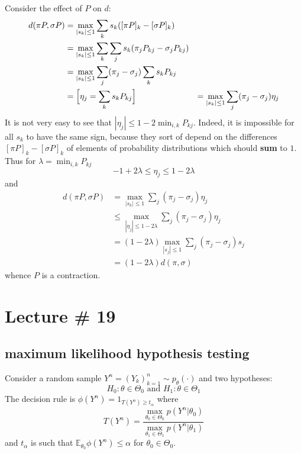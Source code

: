 \documentclass[a4paper]{article}
\newcommand{\ex}{\mathbb{E}}
\begin{document}
Consider the effect of $P$ on $d$:
\begin{align*}
	d( \pi P,\sigma P)
	&= \max_{|s_k| \leq 1} \sum_k s_k ([\pi P]_k-[\sigma P]_k)\\
	&= \max_{|s_k| \leq 1} \sum_k \sum_j s_k (\pi_j P_{kj} - \sigma_j P_{kj})\\
	&= \max_{|s_k| \leq 1} \sum_j (\pi_j - \sigma_j ) \sum_k s_k P_{kj}\\
	&= \Bigl[\eta_j = \sum_k s_k P_{kj} \Bigr]
	&= \max_{|s_k| \leq 1} \sum_j (\pi_j - \sigma_j ) \eta_j
\end{align*}
It is not very easy to see that $|\eta_j| \leq 1 - 2\min_{i,k} P_{kj}$. Indeed,
it is impossible for all $s_k$ to have the same sign, because they sort of depend
on the differences $[\pi P]_k-[\sigma P]_k$ of elements of probability distributions
which should \textbf{sum} to $1$. Thus for $\lambda = \min_{i,k} P_{kj}$
\[-1+2\lambda \leq \eta_j \leq 1-2\lambda\]
and
\begin{align*}
	d( \pi P,\sigma P)
	&= \max_{|s_k| \leq 1} \sum_j (\pi_j - \sigma_j ) \eta_j\\
	&\leq \max_{|\eta_j| \leq 1-2\lambda} \sum_j (\pi_j - \sigma_j ) \eta_j\\
	&= (1-2\lambda) \max_{|s_j| \leq 1 } \sum_j (\pi_j - \sigma_j ) s_j\\
	&= (1-2\lambda) d(\pi,\sigma)
\end{align*}
whence $P$ is a contraction.



\section{Lecture \# 19} %
\label{sec:lecture_19}

\subsection{maximum likelihood hypothesis testing} %
\label{sub:maximum_likelihood_hypothesis_testing}

Consider a random sample $Y^n = (Y_k)_{k=1}^n\sim p_\theta(\cdot)$ and two hypotheses:
\[H_0: \theta\in \Theta_0\text{ and }H_1: \theta\in \Theta_1\]
The decision rule is $\phi(Y^n) = 1_{T(Y^n)\geq t_\alpha}$
where 
\[T(Y^n) = \frac{\max_{\theta_0\in \Theta_0} p(Y^n|\theta_0)}{\max_{\theta_1\in \Theta_1} p(Y^n|\theta_1)}\]
and $t_\alpha$ is such that $\ex_{\theta_0} \phi(Y^n) \leq \alpha$ for $\theta_0\in \Theta_0$.
\end{document}

